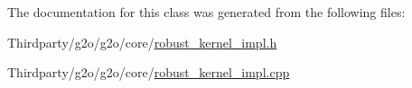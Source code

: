 The documentation for this class was generated from the following files\+:\begin{DoxyCompactItemize}
\item 
Thirdparty/g2o/g2o/core/\mbox{\hyperlink{robust__kernel__impl_8h}{robust\+\_\+kernel\+\_\+impl.\+h}}\item 
Thirdparty/g2o/g2o/core/\mbox{\hyperlink{robust__kernel__impl_8cpp}{robust\+\_\+kernel\+\_\+impl.\+cpp}}\end{DoxyCompactItemize}
